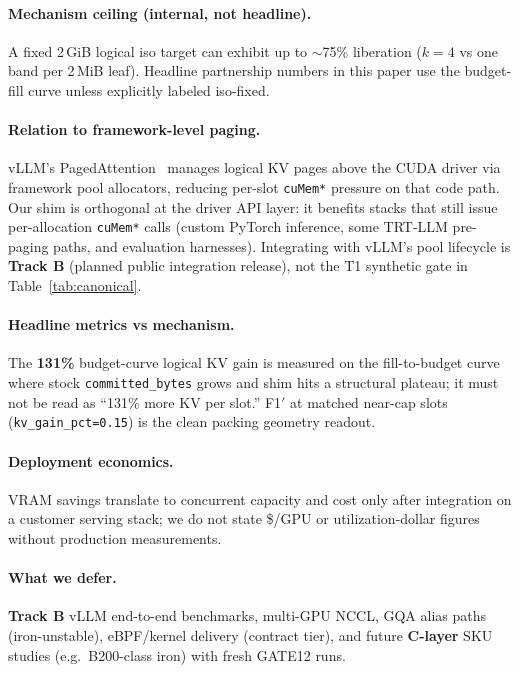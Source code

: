 \documentclass[11pt]{article}
\begin{document}
\paragraph{Mechanism ceiling (internal, not headline).}
A fixed 2\,GiB logical iso target can exhibit up to ${\sim}$75\% liberation ($k{=}4$ vs one band per 2\,MiB leaf).
Headline partnership numbers in this paper use the budget-fill curve unless explicitly labeled iso-fixed.

\paragraph{Relation to framework-level paging.}
vLLM's PagedAttention~\cite{vllm} manages logical KV pages above the CUDA driver via framework pool allocators, reducing per-slot \texttt{cuMem*} pressure on that code path.
Our shim is orthogonal at the driver API layer: it benefits stacks that still issue per-allocation \texttt{cuMem*} calls (custom PyTorch inference, some TRT-LLM pre-paging paths, and evaluation harnesses).
Integrating with vLLM's pool lifecycle is \textbf{Track B} (planned public integration release), not the T1 synthetic gate in Table~\ref{tab:canonical}.

\paragraph{Headline metrics vs mechanism.}
The \textbf{131\%} budget-curve logical KV gain is measured on the fill-to-budget curve where stock \texttt{committed\_bytes} grows and shim hits a structural plateau; it must not be read as ``131\% more KV per slot.''
F1$'$ at matched near-cap slots (\texttt{kv\_gain\_pct=0.15}) is the clean packing geometry readout.

\paragraph{Deployment economics.}
VRAM savings translate to concurrent capacity and cost only after integration on a customer serving stack; we do not state \$/GPU or utilization-dollar figures without production measurements.

\paragraph{What we defer.}
\textbf{Track B} vLLM end-to-end benchmarks, multi-GPU NCCL, GQA alias paths (iron-unstable), eBPF/kernel delivery (contract tier), and future \textbf{C-layer} SKU studies (e.g.\ B200-class iron) with fresh GATE12 runs.
\end{document}
